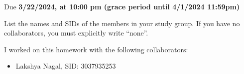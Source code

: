 \documentclass[11pt]{article}
\def\duedate{3/22/2024, at 10:00 pm (grace period until 4/1/2024 11:59pm)}
\begin{document}
\maketitle

Due \textbf{\duedate}

List the names and SIDs of the members in your study group.
If you have no collaborators, you must explicitly write ``none''.

\begin{solution} I worked on this homework with the following collaborators:
\begin{itemize}
    \item Lakshya Nagal, SID: 3037935253 
\end{itemize}
\end{solution}
\end{document}
